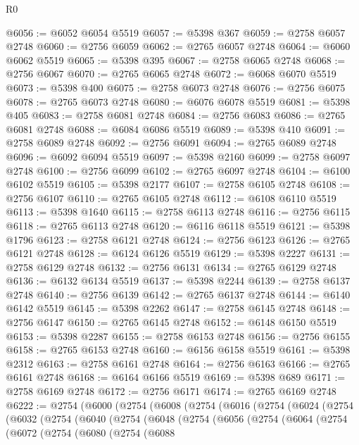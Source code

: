 \begin{lexlean}{R0}
\begin{coremodule}
@6056 := @6052 @6054 @5519
@6057 := @5398 @367
@6059 := @2758 @6057 @2748
@6060 := @2756 @6059
@6062 := @2765 @6057 @2748
@6064 := @6060 @6062 @5519
@6065 := @5398 @395
@6067 := @2758 @6065 @2748
@6068 := @2756 @6067
@6070 := @2765 @6065 @2748
@6072 := @6068 @6070 @5519
@6073 := @5398 @400
@6075 := @2758 @6073 @2748
@6076 := @2756 @6075
@6078 := @2765 @6073 @2748
@6080 := @6076 @6078 @5519
@6081 := @5398 @405
@6083 := @2758 @6081 @2748
@6084 := @2756 @6083
@6086 := @2765 @6081 @2748
@6088 := @6084 @6086 @5519
@6089 := @5398 @410
@6091 := @2758 @6089 @2748
@6092 := @2756 @6091
@6094 := @2765 @6089 @2748
@6096 := @6092 @6094 @5519
@6097 := @5398 @2160
@6099 := @2758 @6097 @2748
@6100 := @2756 @6099
@6102 := @2765 @6097 @2748
@6104 := @6100 @6102 @5519
@6105 := @5398 @2177
@6107 := @2758 @6105 @2748
@6108 := @2756 @6107
@6110 := @2765 @6105 @2748
@6112 := @6108 @6110 @5519
@6113 := @5398 @1640
@6115 := @2758 @6113 @2748
@6116 := @2756 @6115
@6118 := @2765 @6113 @2748
@6120 := @6116 @6118 @5519
@6121 := @5398 @1796
@6123 := @2758 @6121 @2748
@6124 := @2756 @6123
@6126 := @2765 @6121 @2748
@6128 := @6124 @6126 @5519
@6129 := @5398 @2227
@6131 := @2758 @6129 @2748
@6132 := @2756 @6131
@6134 := @2765 @6129 @2748
@6136 := @6132 @6134 @5519
@6137 := @5398 @2244
@6139 := @2758 @6137 @2748
@6140 := @2756 @6139
@6142 := @2765 @6137 @2748
@6144 := @6140 @6142 @5519
@6145 := @5398 @2262
@6147 := @2758 @6145 @2748
@6148 := @2756 @6147
@6150 := @2765 @6145 @2748
@6152 := @6148 @6150 @5519
@6153 := @5398 @2287
@6155 := @2758 @6153 @2748
@6156 := @2756 @6155
@6158 := @2765 @6153 @2748
@6160 := @6156 @6158 @5519
@6161 := @5398 @2312
@6163 := @2758 @6161 @2748
@6164 := @2756 @6163
@6166 := @2765 @6161 @2748
@6168 := @6164 @6166 @5519
@6169 := @5398 @689
@6171 := @2758 @6169 @2748
@6172 := @2756 @6171
@6174 := @2765 @6169 @2748
@6222 := @2754
    (@6000
      (@2754
        (@6008
          (@2754
            (@6016
              (@2754
                (@6024
                  (@2754
                    (@6032
                      (@2754
                        (@6040
                          (@2754
                            (@6048
                              (@2754
                                (@6056
                                  (@2754
                                    (@6064
                                      (@2754
                                        (@6072
                                          (@2754
                                            (@6080
                                              (@2754
                                                (@6088

\end{coremodule}
\end{lexlean}
